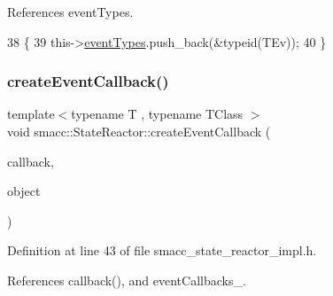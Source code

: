 References event\+Types.


\begin{DoxyCode}
38 \{
39     this->\hyperlink{classsmacc_1_1StateReactor_a65c8ddfce40e7859e5c73fff1cf6c04b}{eventTypes}.push\_back(&\textcolor{keyword}{typeid}(TEv));
40 \}
\end{DoxyCode}
\mbox{\label{classsmacc_1_1StateReactor_a68482e08f6449694a0bcda843b14b376}} 
\subsubsection{\texorpdfstring{create\+Event\+Callback()}{createEventCallback()}\hspace{0.1cm}{\footnotesize\ttfamily [1/2]}}
{\footnotesize\ttfamily template$<$typename T , typename T\+Class $>$ \\
void smacc\+::\+State\+Reactor\+::create\+Event\+Callback (\begin{DoxyParamCaption}\item[{void(T\+Class\+::$\ast$)(T $\ast$)}]{callback,  }\item[{T\+Class $\ast$}]{object }\end{DoxyParamCaption})}



Definition at line 43 of file smacc\+\_\+state\+\_\+reactor\+\_\+impl.\+h.



References callback(), and event\+Callbacks\+\_\+.


